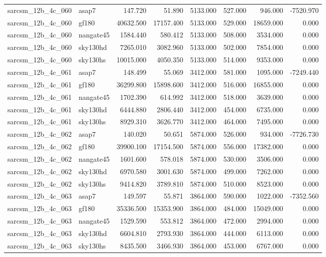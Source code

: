 \begin{tabular}{llrrrrrr}
sarcsm\_12b\_4c\_060 & asap7 & 147.720 & 51.890 & 5133.000 & 527.000 & 946.000 & -7520.970 \\
sarcsm\_12b\_4c\_060 & gf180 & 40632.500 & 17157.400 & 5133.000 & 529.000 & 18659.000 & 0.000 \\
sarcsm\_12b\_4c\_060 & nangate45 & 1584.440 & 580.412 & 5133.000 & 508.000 & 3534.000 & 0.000 \\
sarcsm\_12b\_4c\_060 & sky130hd & 7265.010 & 3082.960 & 5133.000 & 502.000 & 7854.000 & 0.000 \\
sarcsm\_12b\_4c\_060 & sky130hs & 10015.000 & 4050.350 & 5133.000 & 514.000 & 9353.000 & 0.000 \\
sarcsm\_12b\_4c\_061 & asap7 & 148.499 & 55.069 & 3412.000 & 581.000 & 1095.000 & -7249.440 \\
sarcsm\_12b\_4c\_061 & gf180 & 36299.800 & 15898.600 & 3412.000 & 516.000 & 16855.000 & 0.000 \\
sarcsm\_12b\_4c\_061 & nangate45 & 1702.390 & 614.992 & 3412.000 & 518.000 & 3639.000 & 0.000 \\
sarcsm\_12b\_4c\_061 & sky130hd & 6444.880 & 2806.440 & 3412.000 & 454.000 & 6735.000 & 0.000 \\
sarcsm\_12b\_4c\_061 & sky130hs & 8929.310 & 3626.770 & 3412.000 & 464.000 & 7495.000 & 0.000 \\
sarcsm\_12b\_4c\_062 & asap7 & 140.020 & 50.651 & 5874.000 & 526.000 & 934.000 & -7726.730 \\
sarcsm\_12b\_4c\_062 & gf180 & 39900.100 & 17154.500 & 5874.000 & 556.000 & 17382.000 & 0.000 \\
sarcsm\_12b\_4c\_062 & nangate45 & 1601.600 & 578.018 & 5874.000 & 530.000 & 3506.000 & 0.000 \\
sarcsm\_12b\_4c\_062 & sky130hd & 6970.580 & 3001.630 & 5874.000 & 499.000 & 7262.000 & 0.000 \\
sarcsm\_12b\_4c\_062 & sky130hs & 9414.820 & 3789.810 & 5874.000 & 510.000 & 8523.000 & 0.000 \\
sarcsm\_12b\_4c\_063 & asap7 & 149.597 & 55.871 & 3864.000 & 590.000 & 1022.000 & -7352.560 \\
sarcsm\_12b\_4c\_063 & gf180 & 35336.500 & 15353.900 & 3864.000 & 484.000 & 15049.000 & 0.000 \\
sarcsm\_12b\_4c\_063 & nangate45 & 1529.590 & 553.812 & 3864.000 & 472.000 & 2994.000 & 0.000 \\
sarcsm\_12b\_4c\_063 & sky130hd & 6604.810 & 2793.930 & 3864.000 & 444.000 & 6113.000 & 0.000 \\
sarcsm\_12b\_4c\_063 & sky130hs & 8435.500 & 3466.930 & 3864.000 & 453.000 & 6767.000 & 0.000 \\

\end{tabular}
